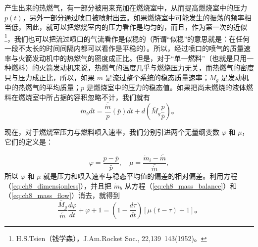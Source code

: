 产生出来的热燃气，有一部分被用来充加在燃烧室中，从而提高燃烧室中的压力 $ p(t) $，另外一部分通过喷口被喷射出去。如果燃烧室中可能发生的振荡的频率相当低，因此，就可以把燃烧室内的压力看作是均匀的，而且，作为第一次的近似\footnote{H.S.Tsien（钱学森），J.Am.Rocket Soc., 22,139~143(1952)。}，我们也可以把流过喷口的气流看作是似稳的（所谓“似稳”的意思就是：在任何一段不太长的时间间隔内都可以看作是平稳的）。所以，经过喷口的喷气的质量速率与火箭发动机中的热燃气的密度成正比。但是，对于“单一燃料”（也就是只用一种燃料）的火箭发动机来说，热燃气的温度几乎与燃烧压力无关，而热燃气的密度只与压力成正比，所以，如果 $ \bar{m} $ 是流过整个系统的稳态质量速率；$ M_g $ 是发动机中的热燃气的平均质量；$ p $ 是燃烧室中的压力的稳态值。如果把尚未燃烧的液体燃料在燃烧室中所占据的容积忽略不计，我们就有
\begin{equation}\label{eq:ch8_mass_flow}
\dot{m}_bdt = \frac{\bar{\dot{m}}}{p}(\bar{p})dt + d(\bar{M}_g\frac{p}{\bar{p}})。
\end{equation}

现在，对于燃烧室压力与燃料喷入速率，我们分别引进两个无量纲变数 $ \varphi $ 和 $ \mu $，它们的定义是：

\begin{equation}\label{eq:ch8_dimensionless}
\varphi = \frac{p - \bar{p}}{\bar{p}}, \quad \mu = \frac{\dot{m}_i - \bar{\dot{m}}}{\bar{\dot{m}}},
\end{equation}
所以 $ \varphi $ 和 $ \mu $ 就是压力和喷入速率与稳态平均值的偏差的相对偏差。利用方程（\ref{eq:ch8_dimensionless}），并且把 $ \dot{m}_b $ 从方程（\ref{eq:ch8_mass_balance}）和（\ref{eq:ch8_mass_flow}）消去，就得到
\begin{equation}\label{eq:ch8_dynamic}
\frac{\bar{M}_g}{\bar{\dot{m}}}\frac{d\varphi}{dt} + \varphi + 1 = (1 - \frac{d\tau}{dt})[\mu(t - \tau) + 1]。
\end{equation}

